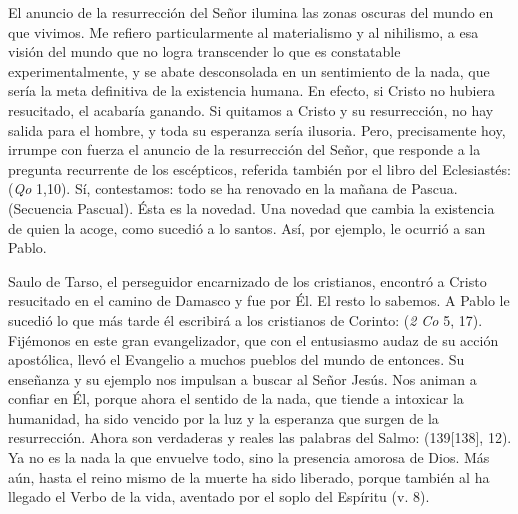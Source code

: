 \begin{body}
El anuncio de la resurrección del Señor ilumina las zonas oscuras del mundo en que vivimos. Me refiero particularmente al materialismo y al nihilismo, a esa visión del mundo que no logra transcender lo que es constatable experimentalmente, y se abate desconsolada en un sentimiento de la nada, que sería la meta definitiva de la existencia humana. En efecto, si Cristo no hubiera resucitado, el  acabaría ganando. Si quitamos a Cristo y su resurrección, no hay salida para el hombre, y toda su esperanza sería ilusoria. Pero, precisamente hoy, irrumpe con fuerza el anuncio de la resurrección del Señor, que responde a la pregunta recurrente de los escépticos, referida también por el libro del Eclesiastés:   (\textit{Qo} 1,10). Sí, contestamos: todo se ha renovado en la mañana de Pascua.  (Secuencia Pascual). Ésta es la novedad. Una novedad que cambia la existencia de quien la acoge, como sucedió a lo santos. Así, por ejemplo, le ocurrió a san Pablo. 

 Saulo de Tarso, el perseguidor encarnizado de los cristianos, encontró a Cristo resucitado en el camino de Damasco y fue  por Él. El resto lo sabemos. A Pablo le sucedió lo que más tarde él escribirá a los cristianos de Corinto:  (\textit{2 Co} 5, 17). Fijémonos en este gran evangelizador, que con el entusiasmo audaz de su acción apostólica, llevó el Evangelio a muchos pueblos del mundo de entonces. Su enseñanza y su ejemplo nos impulsan a buscar al Señor Jesús. Nos animan a confiar en Él, porque ahora el sentido de la nada, que tiende a intoxicar la humanidad, ha sido vencido por la luz y la esperanza que surgen de la resurrección. Ahora son verdaderas y reales las palabras del Salmo:  (139[138], 12). Ya no es la nada la que envuelve todo, sino la presencia amorosa de Dios. Más aún, hasta el reino mismo de la muerte ha sido liberado, porque también al  ha llegado el Verbo de la vida, aventado por el soplo del Espíritu (v. 8). 


\end{body}
